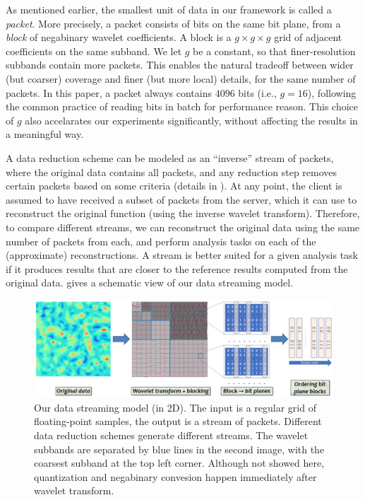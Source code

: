 As mentioned earlier, the smallest unit of data in our framework is called a
\emph{packet}.  More precisely, a packet consists of bits on the same bit
plane, from a \emph{block} of negabinary wavelet coefficients. A block is a
$g\times g\times g$ grid of adjacent coefficients on the same subband. We let
$g$ be a constant, so that finer-resolution subbands contain more packets. This
enables the natural tradeoff between wider (but coarser) coverage and finer
(but more local) details, for the same number of packets. In this paper, a
packet always contains $4096$ bits (i.e., $g=16$), following the common
practice of reading bits in batch for performance reason. This choice of $g$
also accelarates our experiments significantly, without affecting the results
in a meaningful way. 

A data reduction scheme can be modeled as an ``inverse'' stream of packets,
where the original data contains all packets, and any reduction step removes
certain packets based on some criteria (details in
).    At any point, the client is assumed to have received a subset of
packets from the server, which it can use to reconstruct the original function
(using the inverse wavelet transform). Therefore, to compare different streams,
we can reconstruct the original data using the same number of packets from
each, and perform analysis tasks on each of the (approximate) reconstructions.
A stream is better suited for a given analysis task if it produces results that
are closer to  the reference results
computed from the original data.   gives a schematic view of
our data streaming model.

\begin{figure}[h]
\centering
\includegraphics[width=\linewidth]{img/pipeline.png}
\caption{Our data streaming model (in 2D). The input is a regular grid of
floating-point samples, the output is a stream of packets. Different data
reduction schemes generate different streams.  The wavelet subbands are
separated by blue lines in the second image, with the coarsest subband at the
top left corner. Although not showed here, quantization and negabinary
convesion happen immediately after wavelet transform. }\label{fig:pipeline}
\end{figure}

